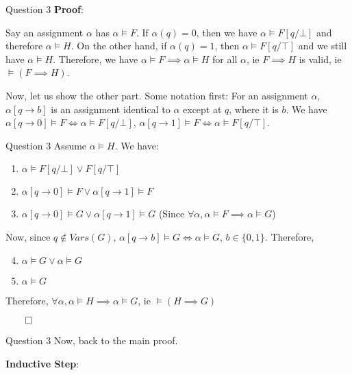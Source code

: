 \documentclass{beamer}
\begin{document}
{\begin{frame}{Question 3}
            \textbf{Proof}:

            Say an assignment $\alpha$ has $\alpha \vDash F$. If $\alpha(q) = 0$, then we have $\alpha \vDash F[q/\bot]$ and therefore $\alpha \vDash H$. On the other hand, if $\alpha(q) = 1$, then $\alpha \vDash F[q/\top]$ and we still have $\alpha \vDash H$. Therefore, we have $\alpha \vDash F \implies \alpha \vDash H$ for all $\alpha$, ie $F \implies H$ is valid, ie $\vDash (F \implies H)$.

            Now, let us show the other part. Some notation first: For an assignment $\alpha$, $\alpha[q \rightarrow b]$ is an assignment identical to $\alpha$ except at $q$, where it is $b$. We have $\alpha[q \rightarrow 0] \vDash F \iff \alpha \vDash F[q/\bot]$, $\alpha[q \rightarrow 1] \vDash F \iff \alpha \vDash F[q/\top]$.
        \end{frame}

        \begin{frame}{Question 3}
            Assume $\alpha \vDash H$. We have:
            \begin{enumerate}
                \item $\alpha \vDash F[q/\bot] \lor F[q/\top]$
                \item  $\alpha[q \rightarrow 0] \vDash F \lor \alpha[q \rightarrow 1] \vDash F$
                \item $\alpha[q \rightarrow 0] \vDash G \lor \alpha[q \rightarrow 1] \vDash G$ (Since $\forall \alpha, \alpha \vDash F \implies \alpha \vDash G$)
            \end{enumerate}
            Now, since $q \notin Vars(G)$, $\alpha[q \rightarrow b] \vDash G \iff \alpha \vDash G$, $b \in \{0, 1\}$. Therefore,
            \begin{enumerate}
                \setcounter{enumi}{3}
                \item $\alpha \vDash G \lor \alpha \vDash G$
                \item $\alpha \vDash G$
            \end{enumerate}
            Therefore, $\forall \alpha, \alpha \vDash H \implies \alpha \vDash G$, ie $\vDash (H \implies G)$

            $\qed$
        \end{frame}

        \begin{frame}{Question 3}
            Now, back to the main proof. 
            
            \textbf{Inductive Step}:


\end{frame}}
\end{document}

